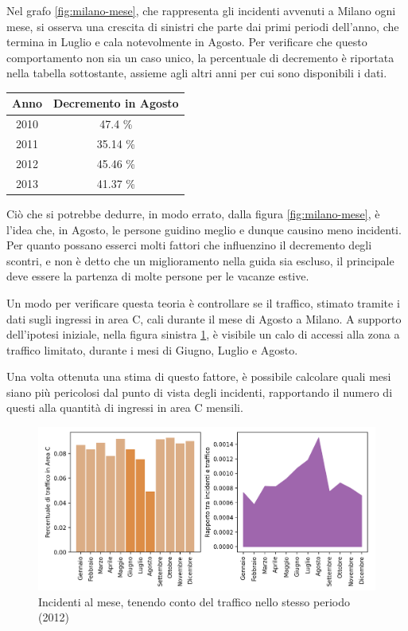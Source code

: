 \documentclass[a4paper,12pt]{report}
\begin{document}
Nel grafo \ref{fig:milano-mese}, che rappresenta gli incidenti avvenuti a Milano ogni mese, 
si osserva una crescita di sinistri che parte dai primi periodi 
dell'anno, che termina in Luglio e cala notevolmente in Agosto. 
Per verificare che questo comportamento non sia 
un caso unico, la percentuale di decremento è riportata nella tabella sottostante, 
assieme agli altri anni per cui sono disponibili i dati. 

\begin{center}
    \def\arraystretch{1.5}%
    \begin{tabular}{ |c|c| } 
        \hline
        Anno & Decremento in Agosto \\ 
        \hline
        2010 & 47.4 \%  \\ 
        \rowcolor{TableGray}
        2011 & 35.14 \% \\
        2012 & 45.46 \% \\
        \rowcolor{TableGray}
        2013 & 41.37 \% \\
        \hline
    \end{tabular}
\end{center}

Ciò che si potrebbe dedurre, in modo errato, dalla figura \ref{fig:milano-mese}, 
è l'idea che, in Agosto, le persone guidino meglio e dunque causino meno incidenti. 
Per quanto possano esserci molti fattori che influenzino il 
decremento degli scontri, e non è detto che un miglioramento nella guida sia escluso, 
il principale deve essere la partenza di molte persone 
per le vacanze estive. 

Un modo per verificare questa teoria è controllare se il traffico, 
stimato tramite i dati sugli ingressi in area C, cali durante il mese di 
Agosto a Milano. 
A supporto dell'ipotesi iniziale, nella figura sinistra \ref{fig:incidenti-traffico-mese}, 
è visibile un calo di accessi alla zona a traffico limitato, 
durante i mesi di Giugno, Luglio e Agosto. 

Una volta ottenuta una stima di questo fattore, è possibile calcolare quali mesi 
siano più pericolosi dal punto di vista degli incidenti, 
rapportando il numero di questi alla quantità di ingressi in area C mensili. 

\begin{figure}
    \includegraphics[width=\linewidth]{../src/area_c/rapporto_mese.png}
    \caption{Incidenti al mese, tenendo conto del traffico nello stesso periodo (2012)}
    \label{fig:incidenti-traffico-mese}
\end{figure}
\end{document}
